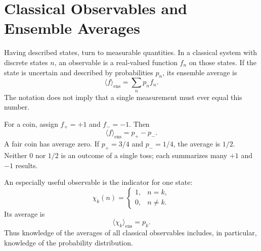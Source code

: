\begin{classroomqa}
\end{classroomqa}

\section{Classical Observables and Ensemble Averages}

Having described states, turn to measurable quantities. In a classical system with discrete states \(n\), an observable is a real-valued function \(f_n\) on those states. If the state is uncertain and described by probabilities \(p_n\), its ensemble average is
\begin{equation}
  \langle f\rangle_{\mathrm{ens}}
  =\sum_n p_n f_n.
  \label{eq:l02-classical-expectation}
\end{equation}
The notation does not imply that a single measurement must ever equal this number.

For a coin, assign \(f_+=+1\) and \(f_-=-1\). Then
\begin{equation}
  \langle f\rangle_{\mathrm{ens}}
  =p_+-p_-.
  \label{eq:l02-coin-expectation}
\end{equation}
A fair coin has average zero. If \(p_+=3/4\) and \(p_-=1/4\), the average is \(1/2\). Neither \(0\) nor \(1/2\) is an outcome of a single toss; each summarizes many \(+1\) and \(-1\) results.

\begin{classroomqa}
\end{classroomqa}

An especially useful observable is the indicator for one state:
\begin{equation}
  \chi_k(n)=
  \begin{cases}
    1,&n=k,\\
    0,&n\ne k.
  \end{cases}
\end{equation}
Its average is
\begin{equation}
  \langle\chi_k\rangle_{\mathrm{ens}}=p_k.
\end{equation}
Thus knowledge of the averages of all classical observables includes, in particular, knowledge of the probability distribution.


